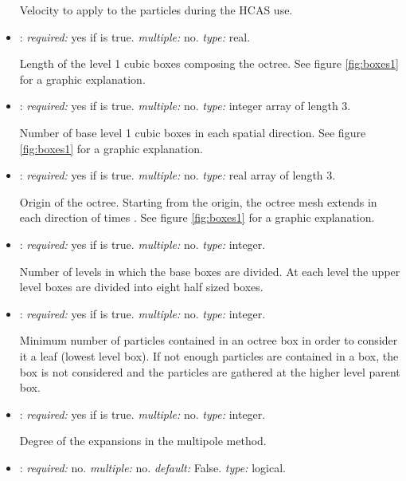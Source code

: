 \begin{itemize}
Velocity to apply to the particles during the HCAS use. 

\item {}: \textit{required:} yes if  is true. \textit{multiple:} no. \textit{type:} real.

Length of the level 1 cubic boxes composing the octree. See figure \ref{fig:boxes1} for a graphic explanation.

\item {}: \textit{required:} yes if  is true. \textit{multiple:} no. \textit{type:} integer array of length 3.

Number of base level 1 cubic boxes in each spatial direction. See figure \ref{fig:boxes1} for a graphic explanation.

\item {}: \textit{required:} yes if  is true. \textit{multiple:} no. \textit{type:} real array of length 3. 

Origin of the octree. Starting from the origin, the octree mesh extends in each direction of  times . See figure \ref{fig:boxes1} for a graphic explanation.

\item {}: \textit{required:} yes if  is true. \textit{multiple:} no. \textit{type:} integer.

Number of levels in  which the base boxes are divided. At each level the upper level boxes are divided into eight half sized boxes. 

\item {}: \textit{required:} yes if  is true. \textit{multiple:} no. \textit{type:} integer.

Minimum number of particles contained in an octree box in order to consider it a leaf (lowest level box). If not enough particles are contained in a box, the box is not considered and the particles are gathered at the higher level parent box.

\item {}: \textit{required:} yes if  is true. \textit{multiple:} no. \textit{type:} integer.

Degree of the expansions in the multipole method. 

\item {}: \textit{required:} no. \textit{multiple:} no. \textit{default:} False. \textit{type:} logical.


\end{itemize}
